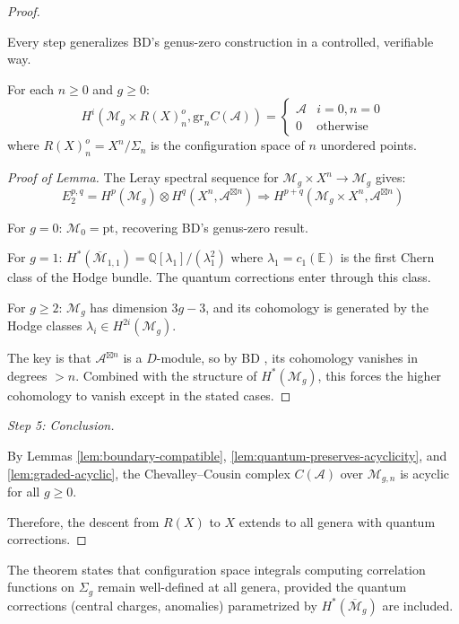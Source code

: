\begin{proof}
\begin{remark}
Every step generalizes BD's genus-zero construction in a controlled, verifiable way.
\end{remark}

\begin{lemma}\label{lem:graded-acyclic}
For each $n \geq 0$ and $g \geq 0$:
\[H^i(\mathcal{M}_g \times R(X)_n^o, \text{gr}_n C(\mathcal{A})) =
\begin{cases}
\mathcal{A} & i=0, n=0 \\
0 & \text{otherwise}
\end{cases}\]
where $R(X)_n^o = X^n / \Sigma_n$ is the configuration space of $n$ unordered points.
\end{lemma}

\begin{proof}[Proof of Lemma]
The Leray spectral sequence for $\mathcal{M}_g \times X^n \to \mathcal{M}_g$ gives:
\[E_2^{p,q} = H^p(\mathcal{M}_g) \otimes H^q(X^n, \mathcal{A}^{\boxtimes n}) 
\Rightarrow H^{p+q}(\mathcal{M}_g \times X^n, \mathcal{A}^{\boxtimes n})\]

For $g=0$: $\mathcal{M}_0 = \text{pt}$, recovering BD's genus-zero result.

For $g=1$: $H^*(\overline{\mathcal{M}}_{1,1}) = \mathbb{Q}[\lambda_1]/(\lambda_1^2)$ where $\lambda_1 = c_1(\mathbb{E})$ is the first Chern class of the Hodge bundle. The quantum corrections enter through this class.

For $g \geq 2$: $\mathcal{M}_g$ has dimension $3g-3$, and its cohomology is generated 
by the Hodge classes $\lambda_i \in H^{2i}(\mathcal{M}_g)$.

The key is that $\mathcal{A}^{\boxtimes n}$ is a $D$-module, so by BD \cite[Lemma 4.2.10]{BD04}, 
its cohomology vanishes in degrees $> n$. Combined with the structure of $H^*(\mathcal{M}_g)$, 
this forces the higher cohomology to vanish except in the stated cases.
\end{proof}

\emph{Step 5: Conclusion.}

By Lemmas \ref{lem:boundary-compatible}, \ref{lem:quantum-preserves-acyclicity}, and 
\ref{lem:graded-acyclic}, the Chevalley--Cousin complex $C(\mathcal{A})$ over 
$\mathcal{M}_{g,n}$ is acyclic for all $g \geq 0$.

Therefore, the descent from $R(X)$ to $X$ extends to all genera with quantum corrections.
\end{proof}

\begin{remark}\label{rem:physical-higher-genus-descent}
The theorem states that configuration space integrals computing correlation functions on $\Sigma_g$ remain well-defined at all genera, provided the quantum corrections (central charges, anomalies) parametrized by $H^*(\overline{\mathcal{M}}_g)$ are included.
\end{remark}

